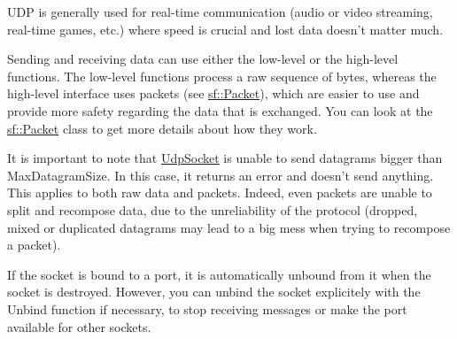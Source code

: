 U\+D\+P is generally used for real-\/time communication (audio or video streaming, real-\/time games, etc.) where speed is crucial and lost data doesn't matter much.

Sending and receiving data can use either the low-\/level or the high-\/level functions. The low-\/level functions process a raw sequence of bytes, whereas the high-\/level interface uses packets (see \hyperlink{classsf_1_1_packet}{sf\+::\+Packet}), which are easier to use and provide more safety regarding the data that is exchanged. You can look at the \hyperlink{classsf_1_1_packet}{sf\+::\+Packet} class to get more details about how they work.

It is important to note that \hyperlink{classsf_1_1_udp_socket}{Udp\+Socket} is unable to send datagrams bigger than Max\+Datagram\+Size. In this case, it returns an error and doesn't send anything. This applies to both raw data and packets. Indeed, even packets are unable to split and recompose data, due to the unreliability of the protocol (dropped, mixed or duplicated datagrams may lead to a big mess when trying to recompose a packet).

If the socket is bound to a port, it is automatically unbound from it when the socket is destroyed. However, you can unbind the socket explicitely with the Unbind function if necessary, to stop receiving messages or make the port available for other sockets.

